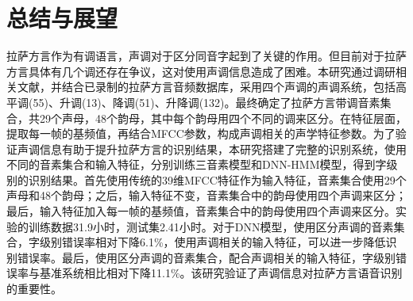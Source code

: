 ﻿%

\chapter{总结与展望}
拉萨方言作为有调语言，声调对于区分同音字起到了关键的作用。但目前对于拉萨方言具体有几个调还存在争议，这对使用声调信息造成了困难。本研究通过调研相关文献，并结合已录制的拉萨方言音频数据库，采用四个声调的声调系统，包括高平调(55)、升调(13)、降调(51)、升降调(132)。最终确定了拉萨方言带调音素集合，共29个声母，48个韵母，其中每个韵母用四个不同的调来区分。在特征层面，提取每一帧的基频值，再结合MFCC参数，构成声调相关的声学特征参数。为了验证声调信息有助于提升拉萨方言的识别结果，本研究搭建了完整的识别系统，使用不同的音素集合和输入特征，分别训练三音素模型和DNN-HMM模型，得到字级别的识别结果。首先使用传统的39维MFCC特征作为输入特征，音素集合使用29个声母和48个韵母；之后，输入特征不变，音素集合中的韵母使用四个声调来区分；最后，输入特征加入每一帧的基频值，音素集合中的韵母使用四个声调来区分。实验的训练数据31.9小时，测试集2.41小时。对于DNN模型，使用区分声调的音素集合，字级别错误率相对下降6.1\%，使用声调相关的输入特征，可以进一步降低识别错误率。最后，使用区分声调的音素集合，配合声调相关的输入特征，字级别错误率与基准系统相比相对下降11.1\%。该研究验证了声调信息对拉萨方言语音识别的重要性。

